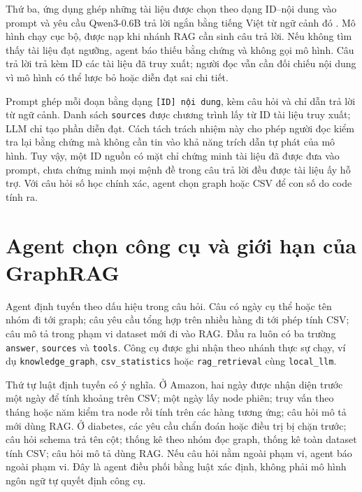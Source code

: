 \documentclass[12pt,a4paper]{report}
\begin{document}
Thứ ba, ứng dụng ghép những tài liệu được chọn theo dạng ID--nội dung vào prompt và yêu cầu
Qwen3-0.6B trả lời ngắn bằng tiếng Việt từ ngữ cảnh đó \cite{essay03-qwen}. Mô hình chạy cục bộ,
được nạp khi nhánh RAG cần sinh câu trả lời. Nếu không tìm thấy tài liệu đạt ngưỡng, agent báo thiếu
bằng chứng và không gọi mô hình. Câu trả lời trả kèm ID các tài liệu đã truy xuất; người đọc vẫn cần
đối chiếu nội dung vì mô hình có thể lược bỏ hoặc diễn đạt sai chi tiết.

Prompt ghép mỗi đoạn bằng dạng \texttt{[ID] nội dung}, kèm câu hỏi và chỉ dẫn trả lời từ ngữ cảnh. Danh sách \texttt{sources} được chương trình lấy từ ID tài liệu truy xuất; LLM chỉ tạo phần diễn đạt. Cách tách trách nhiệm này cho phép người đọc kiểm tra lại bằng chứng mà không cần tin vào khả năng trích dẫn tự phát của mô hình. Tuy vậy, một ID nguồn có mặt chỉ chứng minh tài liệu đã được đưa vào prompt, chưa chứng minh mọi mệnh đề trong câu trả lời đều được tài liệu ấy hỗ trợ. Với câu hỏi số học chính xác, agent chọn graph hoặc CSV để con số do code tính ra.

\section{Agent chọn công cụ và giới hạn của GraphRAG}
Agent định tuyến theo dấu hiệu trong câu hỏi. Câu có ngày cụ thể hoặc tên nhóm đi tới graph;
câu yêu cầu tổng hợp trên nhiều hàng đi tới phép tính CSV; câu mô tả trong phạm vi dataset mới
đi vào RAG. Đầu ra luôn có ba trường \texttt{answer}, \texttt{sources} và \texttt{tools}. Công cụ
được ghi nhận theo nhánh thực sự chạy, ví dụ \texttt{knowledge\_graph},
\texttt{csv\_statistics} hoặc \texttt{rag\_retrieval} cùng \texttt{local\_llm}.

Thứ tự luật định tuyến có ý nghĩa. Ở Amazon, hai ngày được nhận diện trước một ngày để tính khoảng trên CSV; một ngày lấy node phiên; truy vấn theo tháng hoặc năm kiểm tra node rồi tính trên các hàng tương ứng; câu hỏi mô tả mới dùng RAG. Ở diabetes, các yêu cầu chẩn đoán hoặc điều trị bị chặn trước; câu hỏi schema trả tên cột; thống kê theo nhóm đọc graph, thống kê toàn dataset tính CSV; câu hỏi mô tả dùng RAG. Nếu câu hỏi nằm ngoài phạm vi, agent báo ngoài phạm vi. Đây là agent điều phối bằng luật xác định, không phải mô hình ngôn ngữ tự quyết định công cụ.
\end{document}
